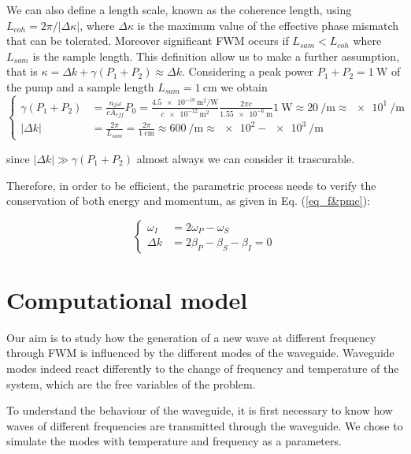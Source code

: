 \documentclass[12pt,a4paper,twoside]{article}
\begin{document}
We can also define a length scale, known as the coherence length, using $L_{coh} = 2\pi/|\Delta\kappa|$, where $\Delta\kappa$ is the maximum value of the effective phase mismatch that can be tolerated.
Moreover significant FWM occurs if $L_{sam}<L_{coh}$ where $L_{sam}$ is the sample length.
This definition allow us to make a further assumption, that is $\kappa = \Delta k + \gamma(P_1 + P_2) \approx \Delta k$.
Considering a peak power $P_1+P_2 = \SI{1}{\W}$ of the pump and a sample length $L_{sam} = \SI{1}{\cm}$ we obtain
\begin{equation}
\left\{
 	\begin{aligned}
		\gamma(P_1 + P_2) &= \frac{n_2\omega}{cA_{eff}}P_0 = \frac{\SI{4.5e-18}{\m^2\per\W}}{c\SI{e-12}{\m^2}}\frac{2\pi c}{\SI{1.55e-6}{\m}}\SI{1}{\W} \approx \SI{20}{\per\m} \approx \SI{e1}{\per\m}\\
		|\Delta k |&= \frac{2\pi}{L_{sam}} = \frac{2\pi}{\SI{1}{\cm}} \approx \SI{600}{\per\m} \approx \num{e2} - \SI{e3}{\per\m}
	\end{aligned}
\right.
\label{eq_gamma_comparison}
\end{equation}

since $|\Delta k| \gg \gamma(P_1 + P_2)$ almost always we can consider it trascurable.

Therefore, in order to be efficient, the parametric process needs to verify the conservation of both energy and momentum, as given in Eq. (\ref{eq_f&pmc}):

\begin{equation*}
\left\{
 	\begin{aligned}
		\omega_I &= 2\omega_P - \omega_S \\
		\Delta k &= 2\beta_P - \beta_S - \beta_I = 0
	\end{aligned}
\right.
\end{equation*}

\clearpage
\section{Computational model}

Our aim is to study how the generation of a new wave at different frequency through FWM is influenced by the different modes of the waveguide.
Waveguide modes indeed react differently to the change of frequency and temperature of the system, which are the free variables of the problem.

To understand the behaviour of the waveguide, it is first necessary to know how waves of different frequencies are transmitted through the waveguide.
We chose to simulate the modes with temperature and frequency as a parameters.
\end{document}
